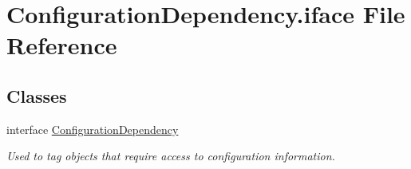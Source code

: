 \hypertarget{ConfigurationDependency_8iface}{\section{Configuration\-Dependency.\-iface File Reference}
\label{ConfigurationDependency_8iface}
}
\subsection*{Classes}
\begin{DoxyCompactItemize}
\item 
interface \hyperlink{interfaceConfigurationDependency}{Configuration\-Dependency}
\begin{DoxyCompactList}\small\item\em Used to tag objects that require access to configuration information. \end{DoxyCompactList}\end{DoxyCompactItemize}

